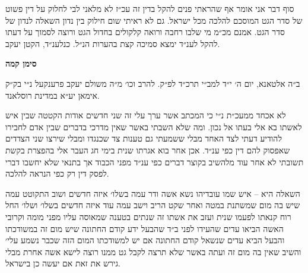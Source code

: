 \documentclass[12pt, openany]{book}
\newcommand{\chapname}{}
\newcommand{\newchap}[1]{
	\addcontentsline{toc}{chapter}{#1}
	\renewcommand{\chapname}{#1}
		\begin{center}
			\textbf{%
\fontsize{16pt}{16pt}\selectfont
				#1}
		\end{center}
}
\begin{document}
\begin{multicols}{2}
סוף דבר אני אומר אף שהראתי פנים להקל בדין זה עכ״ז לא מלאני לבי לחלוק על דין פשוט של סדר הגט המוסכם להלכה מכל ישראל. גם לא ראיתי שום חילוק בין נדון השאלה לנדון של סדר הגט. אמנם מכ״מ מי שלבו רחבה ורואה קלקולים בחדול הגט ורוצה לסמוך על דעתו להקל לענ״ד ימצא סמיכה קצת בהערות הנ״ל. כנלענ״ד, הקטן יעקב.\\\vspace{0pt}

\end{multicols}\newpage

\newchap{סימן קמה}
\begin{multicols}{2}
ב״ה אלטאנא, יום ה׳ י״ד למב״י תרכ״ד לפ״ק. להרב וכו׳ מ״ה משולם יעקב פרענקעל נ״י בק״ק אימאן יע״א במדינת רוסלאנד.\\\vspace{0pt}

לא אכחד ממעכ״ת נ״י כי המכתב אשר ערך עלי זה שני חדשים אודות הקטטה שבין איש לאשתו בא אלי בעתו אל נכון. ומה שלא השבתי באשר שאין מדרכי בדברים שבין אדם לחבירו להודיע דעתי לצד האחד מבלי ששמעתי גם טענות צד שכנגדו ומבלי שירצו שני הצדדים שאפסוק להם דין כפי ענ״ד. אכן אחר בוא אגרתו שנית בימי חג העבר אלי בהפצרת בקשת תשובתי לא אחר עוד מלהשיב בקוצר דברים כפי ענ״ד מפני הכבוד אך בתנאי שלא יחשבו דברי לפסק דין רק כפי הנראה להלכה.\\\vspace{0pt}

השאלה היא – איש שמו עובדיהו נשא אשה ודר עמה בשלו׳ איזה חדשים ושוב התקוטט עמה שיש בה מום שמשתנת במטה ואחר שקט הריב וישב עמה עוד איזה חדשים בשלו׳ ושלו׳ החל רוח קנאתו לפעמו שנית ועזב את אשתו זה שנתים בטענה שמאוסה עליו מפני מומה וקרובי האשה הביאו עדים שהעידו לפני ב״ד שהבעל ידע קודם החתונה שיש מום זה במשודכתו והבעל הביא עדים שנשאל קודם החתונה אם יש למשודכתו המום הזה שכבר נשמע עלי׳ והשיב שאין בה מום זה ועתה באשר שלא תרצה לקבל גט ממנו רוצה לישא אשה אחרת מבלי גירש את זאת אם יעשה כן בישראל.\\\vspace{0pt}


\end{multicols}
\end{document}
